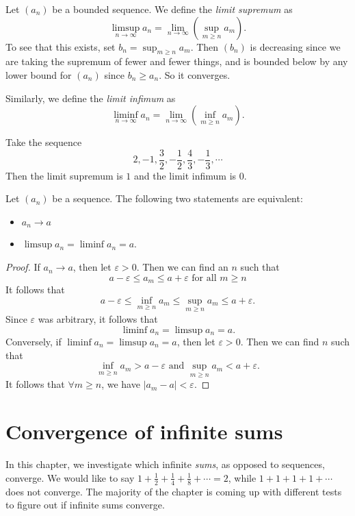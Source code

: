 \documentclass[a4paper]{article}
\begin{document}
\begin{defi}
  Let $(a_n)$ be a bounded sequence. We define the \emph{limit supremum} as
  \[
    \limsup_{n\to \infty} a_n = \lim_{n\to \infty}\left(\sup_{m \geq n} a_m\right).
  \]
  To see that this exists, set $b_n = \sup_{m\geq n}a_m$. Then $(b_n)$ is decreasing since we are taking the supremum of fewer and fewer things, and is bounded below by any lower bound for $(a_n)$ since $b_n \geq a_n$. So it converges.

  Similarly, we define the \emph{limit infimum} as
  \[
    \liminf_{n\to \infty}a_n = \lim_{n\to\infty}\left(\inf_{m\geq n} a_m\right).
  \]
\end{defi}

\begin{eg}
  Take the sequence
  \[
    2, -1, \frac{3}{2}, -\frac{1}{2}, \frac{4}{3}, -\frac{1}{3}, \cdots
  \]
  Then the limit supremum is $1$ and the limit infimum is $0$.
\end{eg}

\begin{lemma}
  Let $(a_n)$ be a sequence. The following two statements are equivalent:
  \begin{itemize}
    \item $a_n\to a$
    \item $\limsup a_n = \liminf a_n = a$.
  \end{itemize}
\end{lemma}

\begin{proof}
  If $a_n \to a$, then let $\varepsilon > 0$. Then we can find an $n$ such that
  \[
    a - \varepsilon \leq a_m \leq a + \varepsilon\text{ for all } m \geq n
  \]
  It follows that
  \[
    a - \varepsilon \leq \inf_{m \geq n}a_m \leq \sup_{m\geq n} a_m \leq a + \varepsilon.
  \]
  Since $\varepsilon$ was arbitrary, it follows that
  \[
    \liminf a_n = \limsup a_n = a.
  \]
  Conversely, if $\liminf a_n = \limsup a_n = a$, then let $\varepsilon > 0$. Then we can find $n$ such that
  \[
    \inf_{m\geq n} a_m > a - \varepsilon\text{ and }\sup _{m \geq n} a_m < a + \varepsilon.
  \]
  It follows that $\forall m\geq n$, we have $|a_m - a| < \varepsilon$.
\end{proof}

\section{Convergence of infinite sums}
In this chapter, we investigate which infinite \emph{sums}, as opposed to sequences, converge. We would like to say $1 + \frac{1}{2} + \frac{1}{4} + \frac{1}{8} + \cdots = 2$, while $1 + 1 + 1 + 1 + \cdots$ does not converge. The majority of the chapter is coming up with different tests to figure out if infinite sums converge.
\end{document}
